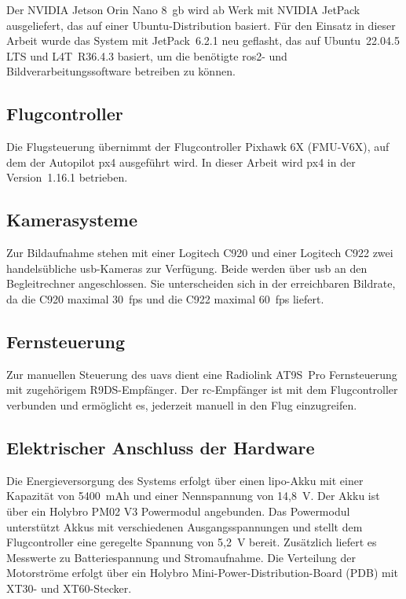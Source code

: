 Der NVIDIA Jetson Orin Nano 8~\gls{gb} wird ab Werk mit NVIDIA JetPack ausgeliefert, das auf einer 
Ubuntu-Distribution basiert.
Für den Einsatz in dieser Arbeit wurde das System mit JetPack~6.2.1 
neu geflasht, das auf Ubuntu~22.04.5 LTS und L4T~R36.4.3 basiert, um die 
benötigte \gls{ros2}- und Bildverarbeitungssoftware betreiben zu können.


\subsection*{Flugcontroller}
Die Flugsteuerung übernimmt der Flugcontroller Pixhawk 6X (FMU-V6X), auf
dem der Autopilot \gls{px4} ausgeführt wird.
In dieser Arbeit wird \gls{px4} in der Version~1.16.1 betrieben.

\subsection*{Kamerasysteme}
Zur Bildaufnahme stehen mit einer Logitech C920 und einer Logitech C922 zwei handelsübliche \gls{usb}-Kameras zur Verfügung.
Beide werden über \gls{usb} an den Begleitrechner angeschlossen.
Sie unterscheiden sich in der erreichbaren Bildrate, da die C920 maximal 30~\gls{fps} und die C922 maximal 60~\gls{fps} liefert.



\subsection*{Fernsteuerung}
Zur manuellen Steuerung des \gls{uav}s dient 
eine Radiolink AT9S~Pro Fernsteuerung mit zugehörigem 
R9DS-Empfänger.
Der \gls{rc}-Empfänger ist mit dem Flugcontroller verbunden und ermöglicht es, 
jederzeit manuell in den Flug einzugreifen.

\subsection*{Elektrischer Anschluss der Hardware}
Die Energieversorgung des Systems erfolgt über einen \gls{lipo}-Akku 
mit einer Kapazität von 5400~mAh und einer 
Nennspannung von 14,8~V.
Der Akku ist über ein Holybro PM02 V3 Powermodul angebunden.
Das Powermodul unterstützt Akkus mit verschiedenen Ausgangsspannungen und stellt dem Flugcontroller 
eine geregelte Spannung von 5,2~V bereit.
Zusätzlich liefert es Messwerte zu Batteriespannung und Stromaufnahme.
Die Verteilung der Motorströme erfolgt über ein Holybro Mini-Power-Distribution-Board (PDB) mit XT30- und XT60-Stecker.~\cite{holybro_pm02,pichler_redpower_xt5400}

